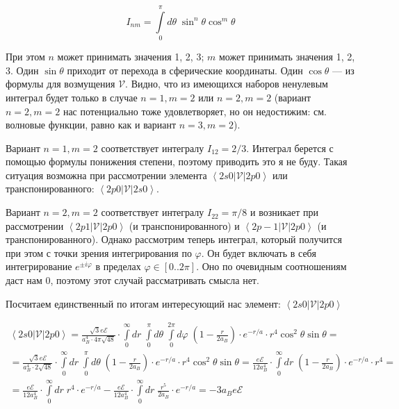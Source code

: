 \documentclass[a4paper, 12pt]{article}
\renewcommand{\phi}{\varphi} %
\newcommand{\bra}[1]
{\ensuremath{\left\langle#1\right|}}
\newcommand{\cat}[1]
{\ensuremath{\left|#1\right\rangle}}
\begin{document}
\begin{equation}
	I_{nm} = \int\limits_0^\pi d\theta\; \sin^n\theta \cos^m\theta
\end{equation}

При этом $n$ может принимать значения 1, 2, 3; $m$ может принимать значения 1, 2, 3. Один $\sin\theta$ приходит от перехода в сферические координаты. Один $\cos\theta$ --- из формулы для возмущения $\mathcal{V}$. Видно, что из имеющихся наборов ненулевым интеграл будет только в случае $n=1, m=2$ или $n=2, m=2$ (вариант $n=2, m=2$ нас потенциально тоже удовлетворяет, но он недостижим: см. волновые функции, равно как и вариант $n=3, m=2$).

Вариант $n=1, m=2$ соответствует интегралу $I_{12} = 2/3$. Интеграл берется с помощью формулы понижения степени, поэтому приводить это я не буду. Такая ситуация возможна при рассмотрении элемента $\bra{2s0}\mathcal{V}\cat{2p0}$ или транспонированного: $\bra{2p0}\mathcal{V}\cat{2s0}$.

Вариант $n=2, m=2$ соответствует интегралу $I_{22} = \pi / 8$ и возникает при рассмотрении $\bra{2p1}\mathcal{V}\cat{2p0}$ (и транспонированного) и $\bra{2p-1}\mathcal{V}\cat{2p0}$ (и транспонированного). Однако рассмотрим теперь интеграл, который получится при этом с точки зрения интегрирования по $\phi$. Он будет включать в себя интегрирование $e^{\pm i\phi}$ в пределах $\phi \in [0..2\pi]$. Оно по очевидным соотношениям даст нам 0, поэтому этот случай рассматривать смысла нет.

Посчитаем единственный по итогам интересующий нас элемент: $\bra{2s0}\mathcal{V}\cat{2p0}$

\begin{align*}
	\bra{2s0}\mathcal{V}\cat{2p0} = \frac{\sqrt{3} e \mathcal{E}}{a_B^4 \cdot 4 \pi \sqrt{48}} \cdot \int\limits_0^\infty dr \; \int\limits_0^\pi d\theta \; \int\limits_0^{2\pi} d\phi \; \left(1 - \frac{r}{2a_B}\right) \cdot e^{-r/a} \cdot r^4 \cos^2\theta \sin\theta = \\
	= \frac{\sqrt{3}e \mathcal{E}}{a_B^4 \cdot 2 \sqrt{48}} \cdot \int\limits_0^\infty dr \; \int\limits_0^\pi d\theta \; \left(1 - \frac{r}{2a_B}\right) \cdot e^{-r/a} \cdot r^4 \cos^2\theta \sin\theta = \frac{e \mathcal{E}}{12a_B^4} \cdot \int\limits_0^\infty dr \; \left(1 - \frac{r}{2a_B}\right) \cdot e^{-r/a} \cdot r^4 = \\
	= \frac{e \mathcal{E}}{12a_B^4} \cdot \int\limits_0^\infty dr \; r^4 \cdot e^{-r/a} - \frac{e \mathcal{E}}{12a_B^4} \cdot \int\limits_0^\infty dr \;\frac{r^5}{2a_B} \cdot e^{-r/a} = -3a_B e \mathcal{E}
\end{align*}
\end{document}
